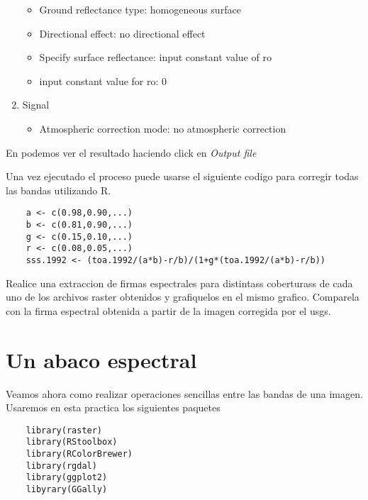 \documentclass[a4paper]{article}
\begin{document}
\begin{enumerate}
        \begin{itemize}
            \item Ground reflectance type: homogeneous surface
            \item Directional effect: no directional effect
            \item Specify surface reflectance: input constant value of ro
            \item input constant value for ro: 0
        \end{itemize}
    \item Signal
        \begin{itemize}
            \item Atmospheric correction mode: no atmospheric correction
        \end{itemize}
\end{enumerate}

En  podemos ver el resultado haciendo click en \emph{Output
file}

Una vez ejecutado el proceso puede usarse el siguiente codigo para corregir
todas las bandas utilizando R.

\begin{lstlisting}
    a <- c(0.98,0.90,...)
    b <- c(0.81,0.90,...)
    g <- c(0.15,0.10,...)
    r <- c(0.08,0.05,...)
    sss.1992 <- (toa.1992/(a*b)-r/b)/(1+g*(toa.1992/(a*b)-r/b))
\end{lstlisting}


\begin{act}
    Realice una extraccion de firmas espectrales para distintass coberturass de
    cada uno de los archivos raster obtenidos y grafiquelos en el mismo grafico.
    Comparela con la firma espectral obtenida a partir de la imagen corregida
    por el usgs.
\end{act}

\section{Un abaco espectral}
\label{sec:abaco}

Veamos ahora como realizar operaciones sencillas entre las bandas de una imagen.
Usaremos en esta practica los siguientes paquetes

\begin{lstlisting}
    library(raster)
    library(RStoolbox)
    library(RColorBrewer)
    library(rgdal)
    library(ggplot2)
    libyrary(GGally)
\end{lstlisting}
\end{document}
